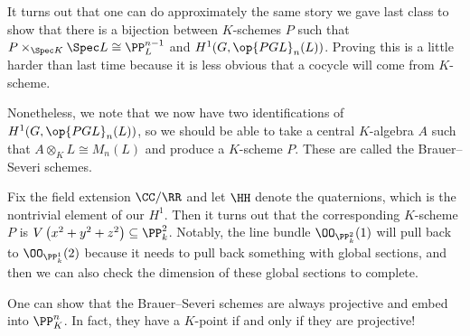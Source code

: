 \documentclass[../notes.tex]{subfiles}
\begin{document}
It turns out that one can do approximately the same story we gave last class to show that there is a bijection between $K$-schemes $P$ such that $P\times_{\Spec K}\Spec L\cong\PP^{n-1}_L$ and $H^1(G,\op{PGL}_n(L))$. Proving this is a little harder than last time because it is less obvious that a cocycle will come from $K$-scheme.

Nonetheless, we note that we now have two identifications of $H^1(G,\op{PGL}_n(L))$, so we should be able to take a central $K$-algebra $A$ such that $A\otimes_KL\cong M_n(L)$ and produce a $K$-scheme $P$. These are called the Brauer--Severi schemes.
\begin{example}
	Fix the field extension $\CC/\RR$ and let $\HH$ denote the quaternions, which is the nontrivial element of our $H^1$. Then it turns out that the corresponding $K$-scheme $P$ is $V\left(x^2+y^2+z^2\right)\subseteq\PP^2_k$. Notably, the line bundle $\OO_{\PP^2_k}(1)$ will pull back to $\OO_{\PP^1_k}(2)$ because it needs to pull back something with global sections, and then we can also check the dimension of these global sections to complete.
\end{example}
\begin{remark}
	One can show that the Brauer--Severi schemes are always projective and embed into $\PP^n_K$.\todo{} In fact, they have a $K$-point if and only if they are projective!
\end{remark}
\end{document}
